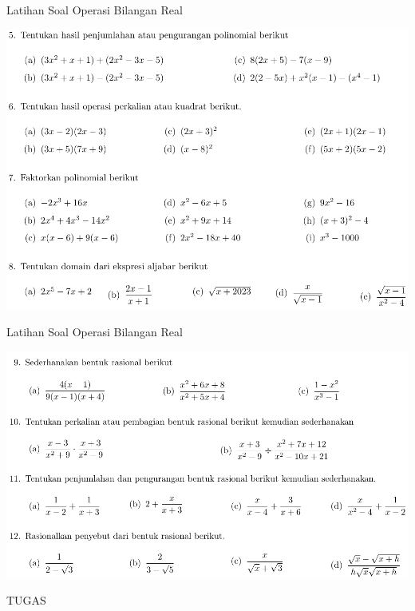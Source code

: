\documentclass[pdflatex,compress,mathserif]{beamer}
\begin{document}
\begin{frame}{Latihan Soal Operasi Bilangan Real}
	\begin{center}
		\includegraphics[width=0.8\linewidth]{img/img45}
	\end{center}
\end{frame}

\begin{frame}{Latihan Soal Operasi Bilangan Real}
	\begin{center}
		\includegraphics[width=0.8\linewidth]{img/img46}
	\end{center}
\end{frame}

\begin{frame}
	\centering
	\Huge{TUGAS}
\end{frame}
\end{document}
